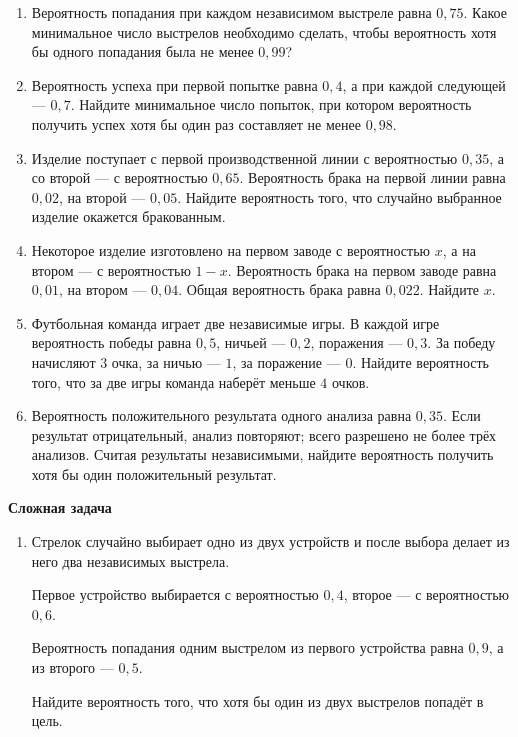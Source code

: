 \documentclass[a4paper,12pt]{article}
\newcommand{\subtopic}[1]{%
  \vspace{0.4em}
  {\large\bfseries\color{darkaccent}#1\par}
  \vspace{0.15em}
}
\begin{document}
\begin{enumerate}[label=\arabic*),resume]

\item
Вероятность попадания при каждом независимом выстреле равна $0{,}75$.
Какое минимальное число выстрелов необходимо сделать, чтобы вероятность
хотя бы одного попадания была не менее $0{,}99$?

\item
Вероятность успеха при первой попытке равна $0{,}4$, а при каждой
следующей --- $0{,}7$.
Найдите минимальное число попыток, при котором вероятность получить успех
хотя бы один раз составляет не менее $0{,}98$.

\item
Изделие поступает с первой производственной линии с вероятностью $0{,}35$,
а со второй --- с вероятностью $0{,}65$.
Вероятность брака на первой линии равна $0{,}02$, на второй --- $0{,}05$.
Найдите вероятность того, что случайно выбранное изделие окажется
бракованным.

\item
Некоторое изделие изготовлено на первом заводе с вероятностью $x$, а на
втором --- с вероятностью $1-x$.
Вероятность брака на первом заводе равна $0{,}01$, на втором --- $0{,}04$.
Общая вероятность брака равна $0{,}022$.
Найдите $x$.

\item
Футбольная команда играет две независимые игры.
В каждой игре вероятность победы равна $0{,}5$, ничьей --- $0{,}2$,
поражения --- $0{,}3$.
За победу начисляют $3$ очка, за ничью --- $1$, за поражение --- $0$.
Найдите вероятность того, что за две игры команда наберёт меньше $4$
очков.

\item
Вероятность положительного результата одного анализа равна $0{,}35$.
Если результат отрицательный, анализ повторяют; всего разрешено не более
трёх анализов.
Считая результаты независимыми, найдите вероятность получить хотя бы один
положительный результат.

\end{enumerate}

\subtopic{Сложная задача}

\begin{enumerate}[label=\arabic*),resume]

\item
Стрелок случайно выбирает одно из двух устройств и после выбора делает из
него два независимых выстрела.

Первое устройство выбирается с вероятностью $0{,}4$, второе --- с
вероятностью $0{,}6$.

Вероятность попадания одним выстрелом из первого устройства равна
$0{,}9$, а из второго --- $0{,}5$.

Найдите вероятность того, что хотя бы один из двух выстрелов попадёт в
цель.

\end{enumerate}
\end{document}
